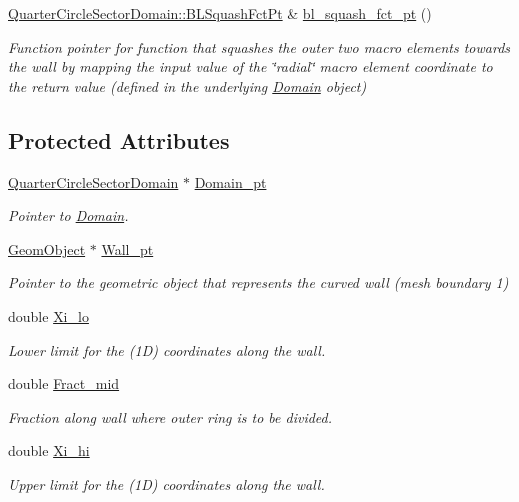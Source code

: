 \begin{DoxyCompactItemize}
\hyperlink{classoomph_1_1QuarterCircleSectorDomain_a6cffab57f87c9f4ab01744647240bb1e}{Quarter\+Circle\+Sector\+Domain\+::\+B\+L\+Squash\+Fct\+Pt} \& \hyperlink{classoomph_1_1QuarterCircleSectorMesh_a6f149022d7a40bd0efed49adacd716bf}{bl\+\_\+squash\+\_\+fct\+\_\+pt} ()
\begin{DoxyCompactList}\small\item\em Function pointer for function that squashes the outer two macro elements towards the wall by mapping the input value of the \char`\"{}radial\char`\"{} macro element coordinate to the return value (defined in the underlying \hyperlink{classoomph_1_1Domain}{Domain} object) \end{DoxyCompactList}\end{DoxyCompactItemize}
\subsection*{Protected Attributes}
\begin{DoxyCompactItemize}
\item 
\hyperlink{classoomph_1_1QuarterCircleSectorDomain}{Quarter\+Circle\+Sector\+Domain} $\ast$ \hyperlink{classoomph_1_1QuarterCircleSectorMesh_a49e72c17a9409ec4a2b7a1ebf98fb4a1}{Domain\+\_\+pt}
\begin{DoxyCompactList}\small\item\em Pointer to \hyperlink{classoomph_1_1Domain}{Domain}. \end{DoxyCompactList}\item 
\hyperlink{classoomph_1_1GeomObject}{Geom\+Object} $\ast$ \hyperlink{classoomph_1_1QuarterCircleSectorMesh_a2cbdec5f0ee2f370c38f1fdc4e2904f8}{Wall\+\_\+pt}
\begin{DoxyCompactList}\small\item\em Pointer to the geometric object that represents the curved wall (mesh boundary 1) \end{DoxyCompactList}\item 
double \hyperlink{classoomph_1_1QuarterCircleSectorMesh_ab5c1e4484c69eb78bd3323321605a93c}{Xi\+\_\+lo}
\begin{DoxyCompactList}\small\item\em Lower limit for the (1D) coordinates along the wall. \end{DoxyCompactList}\item 
double \hyperlink{classoomph_1_1QuarterCircleSectorMesh_a149224b002f785eb357553f8210ad5d3}{Fract\+\_\+mid}
\begin{DoxyCompactList}\small\item\em Fraction along wall where outer ring is to be divided. \end{DoxyCompactList}\item 
double \hyperlink{classoomph_1_1QuarterCircleSectorMesh_a1fa3bfeddd4467e9fe0ec45fbfac0740}{Xi\+\_\+hi}
\begin{DoxyCompactList}\small\item\em Upper limit for the (1D) coordinates along the wall. \end{DoxyCompactList}\end{DoxyCompactItemize}

